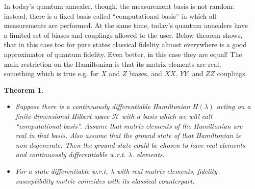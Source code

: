 \documentclass[
  american,aps,pra,reprint,floatfix,nofootinbib,superscriptaddress
]{revtex4-2}
\newtheorem{theorem}{Theorem}
\begin{document}
In today's quantum annealer, though, the measurement basis is not random:
instead, there is a fixed basis called ``computational basis'' in which
all measurements are performed. At the same time, today's quantum annealers
have a limited set of biases and couplings allowed to the user. Below theorem
shows, that in this case too for pure states classical fidelity almost
everywhere is a good approximator of quantum fidelity. Even better, in this
case they are equal!
The main restriction on the Hamiltonian is that its matrix elements are
real, something which is true e.g. for $X$ and $Z$ biases,
and $XX$, $YY$, and $ZZ$ couplings.
\begin{theorem}
  \label{th:comput.basis}
  \begin{itemize}
    \item Suppose there is a continuously differentiable
      Hamiltonian $H(\lambda)$ acting on a
      finite-dimensional Hilbert space $\mathcal{H}$ with a basis which we
      will call ``computational basis''. Assume that matrix elements of the
      Hamiltonian are real in that basis. Also assume that the ground state of
      that Hamiltonian is non-degenerate.
      Then the ground state could be chosen to have real elements and
      continuously differentiable w.r.t. $\lambda$.
      elements.
    \item For a state differentiable w.r.t. $\lambda$ with real matrix elements,
      fidelity susceptibility metric coincides with its classical counterpart.
  \end{itemize}
\end{theorem}
\end{document}
